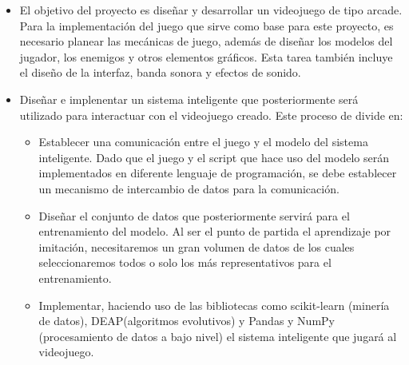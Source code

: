 
 
\begin{itemize}
    \item El objetivo del proyecto es diseñar y desarrollar un videojuego de tipo arcade. Para la implementación del juego que sirve como base para este proyecto, es necesario planear las mecánicas de juego, además de diseñar los modelos del jugador, los enemigos y otros elementos gráficos. Esta tarea también incluye el diseño de la interfaz, banda sonora y efectos de sonido. 
    
    \item Diseñar e implenentar un sistema inteligente que posteriormente será utilizado para interactuar con el videojuego creado. Este proceso de divide en:
    \begin{itemize}
        \item Establecer una comunicación entre el juego y el modelo del sistema inteligente. Dado que el juego y el script que hace uso del modelo serán implementados en diferente lenguaje de programación, se debe establecer un mecanismo de intercambio de datos para la comunicación.
        \item Diseñar el conjunto de datos que posteriormente servirá para el entrenamiento del modelo. Al ser el punto de partida el aprendizaje por imitación, necesitaremos un gran volumen de datos de los cuales seleccionaremos todos o solo los más representativos para el entrenamiento.
        \item Implementar, haciendo uso de las bibliotecas como scikit-learn (minería de datos), DEAP(algoritmos evolutivos) y Pandas y NumPy (procesamiento de datos a bajo nivel) el sistema inteligente que jugará al videojuego.
    \end{itemize}
\end{itemize}
